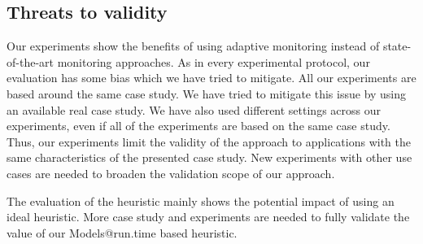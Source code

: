 \subsection{Threats to validity}
Our experiments show the benefits of using adaptive monitoring instead of state-of-the-art monitoring approaches.
As in every experimental protocol, our evaluation has some bias which we have tried to mitigate.
All our experiments are based around the same case study. 
We have tried to mitigate this issue by using an available real case study.
We have also used different settings across our experiments, even if all of the experiments are based on the same case study.
Thus, our experiments limit the validity of the approach to applications with the same characteristics of the presented case study.
New experiments with other use cases are needed to broaden the validation scope of our approach.

The evaluation of the heuristic mainly shows the potential impact of using an ideal heuristic. 
More case study and experiments are needed to fully validate the value of our Models@run.time based heuristic.

